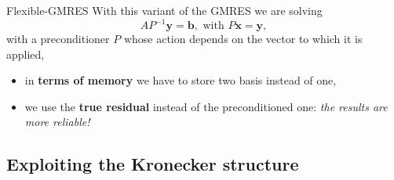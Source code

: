 \documentclass[aspectratio=169,xcolor=dvipsnames]{beamer}
\begin{document}
	\begin{frame}{Flexible-GMRES \parencite{MR1204241}}
	With this variant of the GMRES we are solving
	\[
	A P^{-1} \mathbf{y} = \mathbf{b}, \text{ with } P\mathbf{x} = \mathbf{y},
	\]
	with a preconditioner $P$ whose action depends on the vector to which it is applied,
	\begin{itemize}
		\item[\faMoneyBill] in \textbf{terms of memory} we have to store two basis instead of one,
		\item[\faArrowDown] we use the \textbf{true residual} instead of the preconditioned one: \emph{the results are more reliable!}
	\end{itemize}


	\end{frame}

	\subsection{Exploiting the Kronecker structure}
\end{document}
